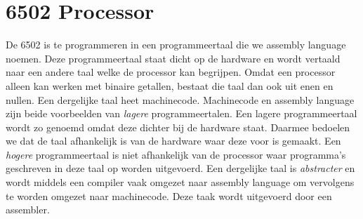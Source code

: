 


\newpage
\section{6502 Processor}


\begin{center}
\end{center}
\vspace{\baselineskip}

De 6502 is te programmeren in een programmeertaal die we assembly language noemen. Deze programmeertaal staat dicht op de hardware en wordt vertaald naar een andere taal welke de processor kan begrijpen. Omdat een processor alleen kan werken met binaire getallen, bestaat die taal dan ook uit enen en nullen. Een dergelijke taal heet machinecode. Machinecode en assembly language zijn beide voorbeelden van \emph{lagere} programmeertalen. Een lagere programmeertaal wordt zo genoemd omdat deze dichter bij de hardware staat. Daarmee bedoelen we dat de taal afhankelijk is van de hardware waar deze voor is gemaakt. Een \emph{hogere} programmeertaal is niet afhankelijk van de processor waar programma's geschreven in deze taal op worden uitgevoerd. Een dergelijke taal is \emph{abstracter} en wordt middels een compiler vaak omgezet naar assembly language om vervolgens te worden omgezet naar machinecode. Deze taak wordt uitgevoerd door een assembler.

